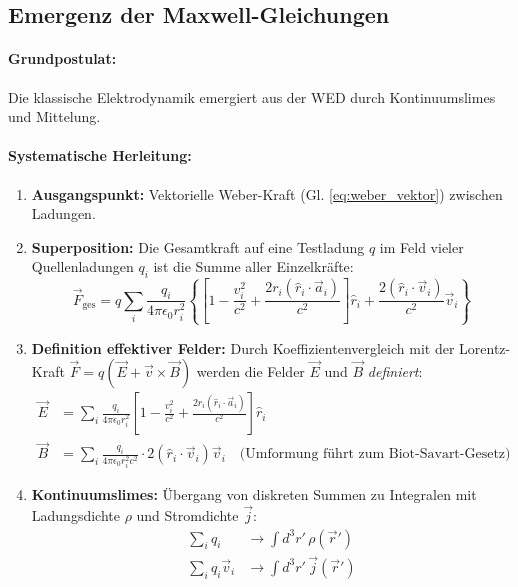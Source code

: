 \documentclass[11pt, a4paper]{article}
\begin{document}
\subsection{Emergenz der Maxwell-Gleichungen}
\label{subsec:emergenz_maxwell}

\paragraph{Grundpostulat:} Die klassische Elektrodynamik emergiert aus der WED durch Kontinuumslimes und Mittelung.

\paragraph{Systematische Herleitung:}
\begin{enumerate}
    \item \textbf{Ausgangspunkt:} Vektorielle Weber-Kraft (Gl. \ref{eq:weber_vektor}) zwischen Ladungen.
    \item \textbf{Superposition:} Die Gesamtkraft auf eine Testladung $q$ im Feld vieler Quellenladungen $q_i$ ist die Summe aller Einzelkräfte:
    \[
    \vec{F}_{\text{ges}} = q \sum_i \frac{q_i}{4\pi\epsilon_0 r_i^2} \left\{ \left[ 1 - \frac{v_i^2}{c^2} + \frac{2r_i (\hat{r}_i \cdot \vec{a}_i)}{c^2} \right] \hat{r}_i + \frac{2 (\hat{r}_i \cdot \vec{v}_i)}{c^2} \vec{v}_i \right\}
    \]
    \item \textbf{Definition effektiver Felder:} Durch Koeffizientenvergleich mit der Lorentz-Kraft $\vec{F} = q(\vec{E} + \vec{v} \times \vec{B})$ werden die Felder $\vec{E}$ und $\vec{B}$ \textit{definiert}:
    \begin{align}
    \vec{E} &= \sum_i \frac{q_i}{4\pi\epsilon_0 r_i^2} \left[ 1 - \frac{v_i^2}{c^2} + \frac{2r_i (\hat{r}_i \cdot \vec{a}_i)}{c^2} \right] \hat{r}_i \\
    \vec{B} &= \sum_i \frac{q_i}{4\pi\epsilon_0 r_i^2 c^2} \cdot 2 (\hat{r}_i \cdot \vec{v}_i) \vec{v}_i \quad \text{(Umformung führt zum Biot-Savart-Gesetz)}
    \end{align}
    \item \textbf{Kontinuumslimes:} Übergang von diskreten Summen zu Integralen mit Ladungsdichte $\rho$ und Stromdichte $\vec{j}$:
    \begin{align}
    \sum_i q_i &\rightarrow \int d^3r' \, \rho(\vec{r}') \\
    \sum_i q_i \vec{v}_i &\rightarrow \int d^3r' \, \vec{j}(\vec{r}')
    \end{align}

\end{enumerate}
\end{document}
